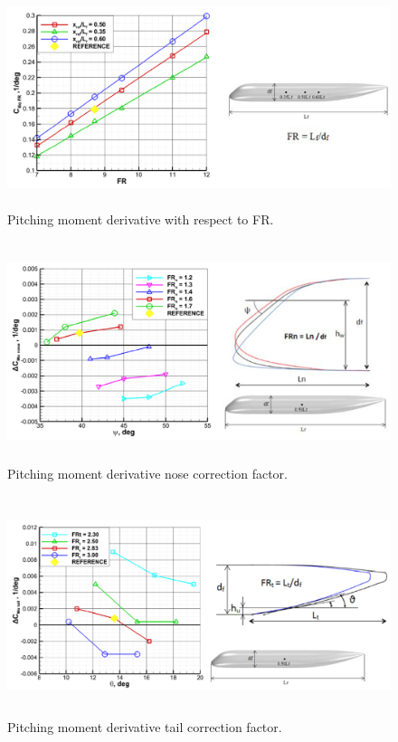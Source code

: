 \begin{figure}[H]
\centering
\includegraphics[height=6.4cm]{Immagini/fuselage4}
\caption{Pitching moment derivative with respect to FR.}
\label{fusgeometry}
\end{figure}
\begin{figure}[H]
\centering
\includegraphics[height=6.4cm]{Immagini/fuselage5}
\caption{Pitching moment derivative nose correction factor.}
\label{fusgeometry}
\end{figure}
\begin{figure}[H]
\centering
\includegraphics[height=6.4cm]{Immagini/fuselage6}
\caption{Pitching moment derivative tail correction factor.}
\label{fusgeometry}
\end{figure}


